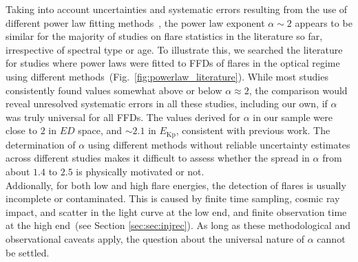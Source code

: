 \documentclass{aa}
\begin{document}
Taking into account uncertainties and systematic errors resulting from the use of different power law fitting methods~\citep{maschberger2009}, the power law exponent $\alpha\sim 2$ appears to be similar for the majority of studies on flare statistics in the literature so far, irrespective of spectral type or age. To illustrate this, we searched the literature for studies where power laws were fitted to FFDs of flares in the optical regime using different methods~(Fig.~\ref{fig:powerlaw_literature}). While most studies consistently found values somewhat above or below $\alpha\approx2$, the comparison would reveal unresolved systematic errors in all these studies, including our own, if $\alpha$ was truly universal for all FFDs. The values derived for $\alpha$ in our sample were close to $2$ in $ED$ space, and $\sim 2.1$ in $E_\mathrm{Kp}$, consistent with previous work. The determination of $\alpha$ using different methods without reliable uncertainty estimates across different studies makes it difficult to assess whether the spread in $\alpha$ from about $1.4$ to $2.5$ is physically motivated or not. 
\\
Addionally, for both low and high flare energies, the detection of flares is usually incomplete or contaminated. This is caused by finite time sampling, cosmic ray impact, and scatter in the light curve at the low end, and finite observation time at the high end~(see Section \ref{sec:sec:injrec}). As long as these methodological and observational caveats apply, the question about the universal nature of $\alpha$ cannot be settled.
\end{document}
